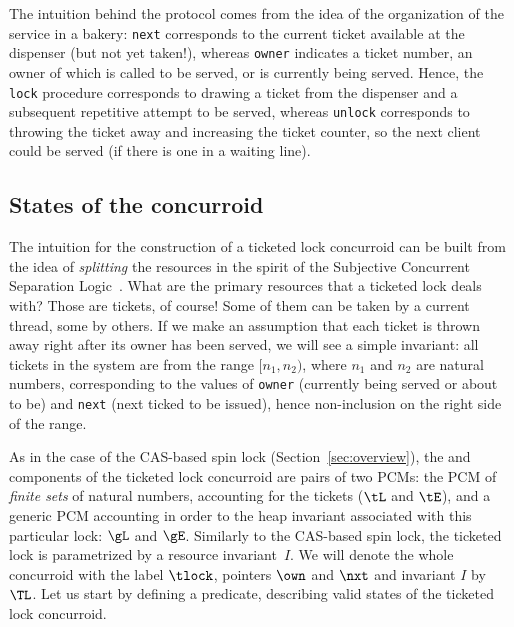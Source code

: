 The intuition behind the protocol comes from the idea of the
organization of the service in a bakery: \texttt{next} corresponds to
the current ticket available at the dispenser (but not yet taken!),
whereas \texttt{owner} indicates a ticket number, an owner of which is
called to be served, or is currently being served. Hence, the
\texttt{lock} procedure corresponds to drawing a ticket from the
dispenser and a subsequent repetitive attempt to be served, whereas
\texttt{unlock} corresponds to throwing the ticket away and increasing
the ticket counter, so the next client could be served (if there is
one in a waiting line).

\subsection{States of the concurroid}
\label{sec:states-concurroid}

The intuition for the construction of a ticketed lock concurroid can
be built from the idea of \emph{splitting} the resources in the spirit
of the Subjective Concurrent Separation
Logic~\cite{LeyWild-Nanevski:POPL13}. What are the primary resources
that a ticketed lock deals with? Those are tickets, of course! Some of
them can be taken by a current thread, some by others. If we make an
assumption that each ticket is thrown away right after its owner has
been served, we will see a simple invariant: all tickets in the system
are from the range $[n_1, n_2)$, where $n_1$ and $n_2$ are natural
numbers, corresponding to the values of \texttt{owner} (currently
being served or about to be) and \texttt{next} (next ticked to be
issued), hence non-inclusion on the right side of the range.

As in the case of the CAS-based spin lock
(Section~\ref{sec:overview}), the \self and \other components of the
ticketed lock concurroid are pairs of two PCMs: the PCM of
\emph{finite sets} of natural numbers, accounting for the tickets
($\tL$ and $\tE$), and a generic PCM accounting in order to the heap
invariant associated with this particular lock: $\gL$ and
$\gE$. Similarly to the CAS-based spin lock, the ticketed lock is
parametrized by a resource invariant~$I$.
%
We will denote the whole concurroid with the label $\tlock$, pointers
$\own$ and $\nxt$ and invariant $I$ by $\TL$. Let us start by defining
a predicate, describing valid states of the ticketed lock concurroid.

